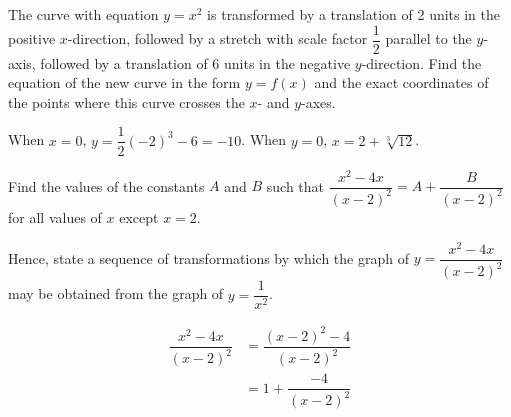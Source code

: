 \documentclass{echw}
\begin{document}

    \problem{}
        The curve with equation $y=x^2$ is transformed by a translation of 2 units in the positive $x$-direction, followed by a stretch with scale factor $\dfrac12$ parallel to the $y$-axis, followed by a translation of 6 units in the negative $y$-direction. Find the equation of the new curve in the form $y = f(x)$ and the exact coordinates of the points where this curve crosses the $x$- and $y$-axes.

    \solution       
        \begin{center}
        \end{center}


        When $x=0$, $y = \dfrac12 (-2)^3 - 6 = -10$. When $y = 0$, $x = 2 + \sqrt[3]{12}$.


    \problem{}
        Find the values of the constants $A$ and $B$ such that $\dfrac{x^2-4x}{(x-2)^2} = A + \dfrac{B}{(x-2)^2}$ for all values of $x$ except $x=2$.

        Hence, state a sequence of transformations by which the graph of $y = \dfrac{x^2-4x}{(x-2)^2}$ may be obtained from the graph of $y = \dfrac1{x^2}$.

    \solution
        \begin{align*}
            \dfrac{x^2-4x}{(x-2)^2} &= \dfrac{(x-2)^2 - 4}{(x-2)^2} \\ 
            &= 1 + \dfrac{- 4}{(x-2)^2} \\ 
        \end{align*}

\end{document}
